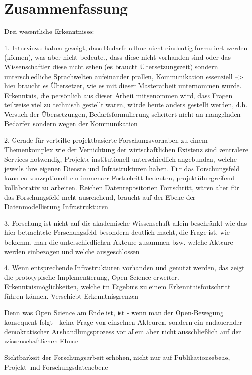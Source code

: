 \onehalfspacing

\section{Zusammenfassung}

Drei wesentliche Erkenntnisse:

1. Interviews haben gezeigt, dass Bedarfe adhoc nicht eindeutig formuliert werden (können), was aber nicht bedeutet, dass diese nicht vorhanden sind oder das Wissenschaftler diese nicht sehen (es braucht Übersetzungszeit) sondern unterschiedliche Sprachwelten aufeinander prallen, Kommunikation essenziell --> hier braucht es Übersetzer, wie es mit dieser Masterarbeit unternommen wurde. Erkenntnis, die persönlich aus dieser Arbeit mitgenommen wird, dass Fragen teilweise viel zu technisch gestellt waren, würde heute anders gestellt werden, d.h. Versuch der Übersetzungen, Bedarfsformulierung scheitert nicht an mangelnden Bedarfen sondern wegen der Kommunikation

2. Gerade für verteilte projektbasierte Forschungsvorhaben zu einem Themenkomplex wie der Vernichtung der wirtschaftlichen Existenz sind zentralere Services notwendig, Projekte institutionell unterschiedlich angebunden, welche jeweils ihre eigenen Dienste und Infrastrukturen haben. Für das Forschungsfeld kann es konzeptionell ein immenser Fortschritt bedeuten, projektübergreifend kollaborativ zu arbeiten. Reichen Datenrepositorien Fortschritt, wären aber für das Forschungsfeld nicht ausreichend, braucht auf der Ebene der Datenmodellierung Infrastrukturen

3. Forschung ist nicht auf die akademische Wissenschaft allein beschränkt wie das hier betrachtete Forschungsfeld besondern deutlich macht, die Frage ist, wie bekommt man die unterschiedlichen Akteure zusammen bzw. welche Akteure werden einbezogen und welche ausgeschlossen

4. Wenn entsprechende Infrastrukturen vorhanden und genutzt werden, das zeigt die prototypische Implementierung, Open Science erweitert Erkenntnismöglichkeiten, welche im Ergebnis zu einem Erkenntnisfortschritt führen können. Verschiebt Erkenntnisgrenzen


Denn was Open Science am Ende ist, ist - wenn man der Open-Bewegung konsequent folgt - keine Frage von einzelnen Akteuren, sondern ein andauernder demokratischer Aushandlungsprozess vor allem aber nicht ausschließlich auf der wissenschaftlichen Ebene


Sichtbarkeit der Forschungsarbeit erhöhen, nicht nur auf Publikationsebene, Projekt und Forschungsdatenebene

